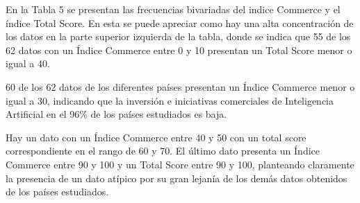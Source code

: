 \documentclass[
]{article}
\begin{document}
\begin{multicols}{2}

En la Tabla 5 se presentan las frecuencias bivariadas del indice Commerce y el índice Total Score. En esta se puede apreciar como hay una alta concentración de los datos en la parte superior izquierda de la tabla, donde se indica que 55 de los 62 datos con un Índice Commerce entre 0 y 10 presentan un Total Score menor o igual a 40.

60 de los 62 datos de los diferentes países presentan un Índice Commerce menor o igual a 30, indicando que la inversión e iniciativas comerciales de Inteligencia Artificial en el 96\% de los países estudiados es baja.

Hay un dato con un Índice Commerce entre 40 y 50 con un total score correspondiente en el rango de 60 y 70. El último dato presenta un Índice Commerce entre 90 y 100 y un Total Score entre 90 y 100, planteando claramente la presencia de un dato atípico por su gran lejanía de los demás datos obtenidos de los países estudiados.

\end{multicols}
\end{document}
